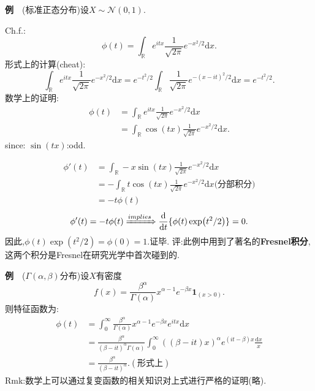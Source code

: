 \begin{frame}
\textbf{例}$\quad$(标准正态分布)设$X\sim\mathcal{N}(0,1)$.

Ch.f.:\begin{equation}
\phi(t) = \int_{\mathbb{R}}e^{itx}\frac{1}{\sqrt{2\pi}}e^{-x^2/2}\mathrm{d}x.
\end{equation}
形式上的计算(cheat):
\begin{equation}
	\int_{\mathbb{R}}e^{itx}\frac{1}{\sqrt{2\pi}}e^{-x^2/2}\mathrm{d}x = 
	e^{-t^2/2}\int_{\mathbb{R}}\frac{1}{\sqrt{2\pi}}e^{-(x-it)^2/2}\mathrm{d}x = e^{-t^2/2}.
\end{equation}
数学上的证明:
\begin{equation}
	\begin{split}
		\phi(t) &= \int_{\mathbb{R}}e^{itx}\frac{1}{\sqrt{2\pi}}e^{-x^2/2}\mathrm{d}x\\
		&= \int_{\mathbb{R}}\cos(tx)\frac{1}{\sqrt{2\pi}}e^{-x^2/2}\mathrm{d}x.
	\end{split}
\end{equation}
since: $\sin(tx)$:odd.
\end{frame}

\begin{frame}
	\begin{equation}
	\begin{split}
	\phi'(t) &= \int_{\mathbb{R}}-x\sin(tx)\frac{1}{\sqrt{2\pi}}e^{-x^2/2}\mathrm{d}x\\
	&= -\int_{\mathbb{R}}t\cos(tx)\frac{1}{\sqrt{2\pi}}e^{-x^2/2}\mathrm{d}x\text{(分部积分)}\\
	&= -t\phi(t)
	\end{split}
	\end{equation}
	\begin{equation*}
		\phi'(t) = -t\phi(t)\xRightarrow[]{implies} \frac{\mathrm{d}}{\mathrm{d}t}\{\phi(t)\exp(t^2/2)\} = 0.
	\end{equation*}
	因此,$\phi(t)\exp(t^2/2) = \phi(0) = 1.$证毕.
	评:此例中用到了著名的\textbf{Fresnel积分},这两个积分是Fresnel在研究光学中首次碰到的.
\end{frame}

\begin{frame}
	\textbf{例}$\quad$($\Gamma(\alpha,\beta)$分布)设$X$有密度
	\begin{equation}
		f(x) = \frac{\beta^\alpha}{\Gamma(\alpha)}x^{\alpha-1}e^{-\beta x}\bm{1}_{(x>0)}.
	\end{equation}
	则特征函数为:
	\begin{equation}
		\begin{split}
			\phi(t) &= \int_{0}^\infty  \frac{\beta^\alpha}{\Gamma(\alpha)}x^{\alpha-1}e^{-\beta x}e^{itx}\mathrm{d}x \\
			&=  \frac{\beta^\alpha}{(\beta-it)^\alpha \Gamma(\alpha)}\int_{0}^\infty ((\beta-it)x)^\alpha e^{(it-\beta)x}\frac{\mathrm{d}x}{x} \\
			&= \frac{\beta^\alpha}{(\beta-it)^\alpha}.(\text{形式上})
		\end{split}
	\end{equation}
	Rmk:数学上可以通过复变函数的相关知识对上式进行严格的证明(略).
\end{frame}


